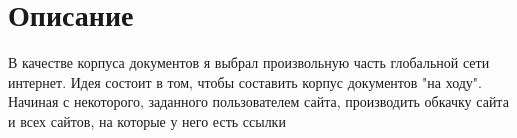 \section{Описание}
В качестве корпуса документов я выбрал произвольную часть глобальной сети интернет. Идея состоит в том, чтобы составить корпус документов "на ходу". Начиная с некоторого, заданного пользователем сайта, производить обкачку сайта и всех сайтов, на которые у него есть ссылки

\pagebreak
\pagebreak

